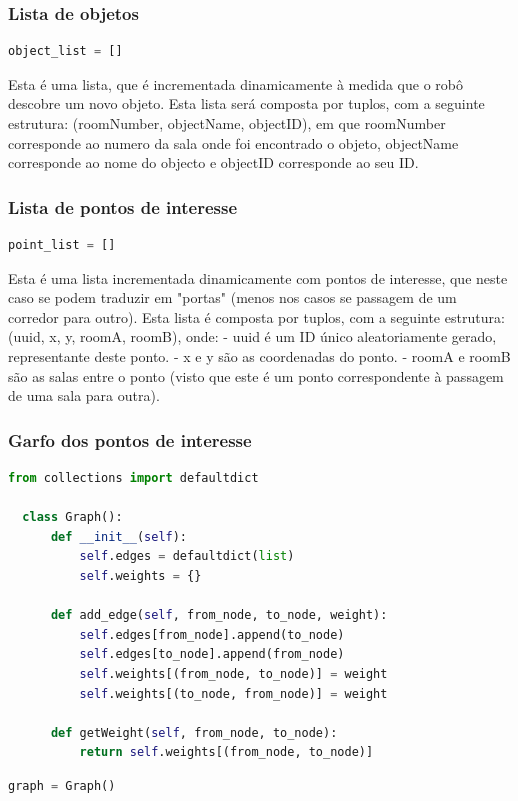 \documentclass{article}
\begin{document}
\subsubsection{Lista de objetos}
\begin{lstlisting}[language=Python]
object_list = []
\end{lstlisting}  

Esta é uma lista, que é incrementada dinamicamente à medida que o robô descobre um novo objeto. Esta lista será composta por tuplos, com a seguinte estrutura: (roomNumber, objectName, objectID), em que roomNumber corresponde ao numero da sala onde foi encontrado o objeto, objectName corresponde ao nome do objecto e objectID corresponde ao seu ID.

\subsubsection{Lista de pontos de interesse}
\begin{lstlisting}[language=Python]
point_list = []
\end{lstlisting}

Esta é uma lista incrementada dinamicamente com pontos de interesse, que neste caso se podem traduzir em "portas" (menos nos casos se passagem de um corredor para outro).
Esta lista é composta por tuplos, com a seguinte estrutura: (uuid, x, y, roomA, roomB), onde:
\newline - uuid é um ID único aleatoriamente gerado, representante deste ponto. 
\newline - x e y são as coordenadas do ponto.
\newline - roomA e roomB são as salas entre o ponto (visto que este é um ponto correspondente à passagem de uma sala para outra).

\subsubsection{Garfo dos pontos de interesse}
\begin{lstlisting}[language=Python]
  from collections import defaultdict

  class Graph():
      def __init__(self):
          self.edges = defaultdict(list)
          self.weights = {}
      
      def add_edge(self, from_node, to_node, weight):
          self.edges[from_node].append(to_node)
          self.edges[to_node].append(from_node)
          self.weights[(from_node, to_node)] = weight
          self.weights[(to_node, from_node)] = weight
  
      def getWeight(self, from_node, to_node):
          return self.weights[(from_node, to_node)]  
\end{lstlisting}
\begin{lstlisting}[language=Python]
graph = Graph()
\end{lstlisting}
\end{document}
